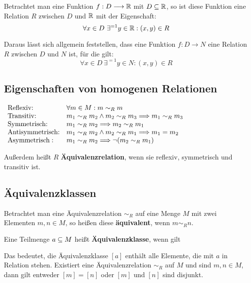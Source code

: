 \documentclass[11pt]{article}
\begin{document}
Betrachtet man eine Funktion $f : D \longrightarrow \mathbb{R}$ mit $D \subseteq \mathbb{R}$, so ist diese Funktion eine Relation $R$ zwischen
$D$ und $\mathbb{R}$ mit der Eigenschaft:
\[
  \forall x \in D~\exists^{=1} y \in \mathbb{R}: (x, y) \in R
\]

Daraus lässt sich allgemein feststellen, dass eine Funktion $f : D \longrightarrow N$ eine Relation $R$ zwischen $D$ und
$N$ ist, für die gilt:
\[
  \forall x \in D~\exists^{=1} y \in N: (x, y) \in R
\]

\subsection{Eigenschaften von homogenen Relationen}
$
  \begin{array}{l l}
    \text{Reflexiv:}        & \forall m \in M: m \sim_R m                                                  \\
    \text{Transitiv:}       & m_1 \sim_R m_2 \land m_2 \sim_R m_3 \Longrightarrow m_1 \sim_R m_3           \\
    \text{Symmetrisch:}     & m_1 \sim_R m_2 \Longrightarrow m_2 \sim_R m_1                                \\
    \text{Antisymmetrisch:} & m_1 \sim_R m_2 \land m_2 \sim_R m_1 \Longrightarrow m_1 = m_2                \\
    \text{Asymmetrisch}:    & m_1 \sim_R m_2 \Longrightarrow \lnot(m_2 \sim_R m_1)                         \\
  \end{array}
$

Außerdem heißt $R$ \textbf{Äquivalenzrelation}, wenn sie reflexiv, symmetrisch und transitiv ist.

\subsection{Äquivalenzklassen}
Betrachtet man eine Äquivalenzrelation $\sim_R$ auf eine Menge $M$ mit zwei Elementen $m, n \in M$, so heißen diese
\textbf{äquivalent}, wenn $m \sim_R n$.

Eine Teilmenge $a \subseteq M$ heißt \textbf{Äquivalenzklasse}, wenn gilt
\ul{
}

Das bedeutet, die Äquivalenzklasse $[a]$ enthält alle Elemente, die mit $a$ in Relation stehen.
Existiert eine Äquivalenzrelation $\sim_R$ auf $M$ und sind $m,n \in M$, dann gilt entweder $[m] = [n]$ oder $[m]$ und
$[n]$ sind disjunkt.
\end{document}
